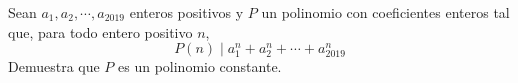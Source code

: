 Sean $a_1, a_2, \cdots , a_{2019}$ enteros positivos y $P$ un polinomio con coeficientes enteros tal que, para todo entero positivo $n$,
\[ P(n) \mid a_1^n + a_2^n + \cdots + a_{2019}^n \]
Demuestra que $P$ es un polinomio constante.
